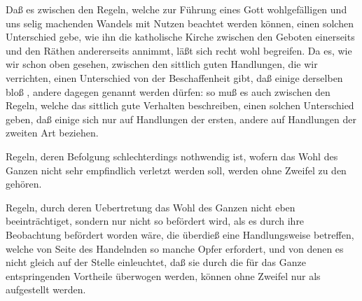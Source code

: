 Daß es zwischen den Regeln, welche zur Führung eines Gott wohlgefälligen und uns selig machenden Wandels mit Nutzen beachtet werden können, einen solchen Unterschied gebe, wie ihn die katholische Kirche zwischen den Geboten einerseits und den Räthen andererseits annimmt, läßt sich recht wohl begreifen. Da es, wie wir schon oben gesehen, zwischen den sittlich guten Handlungen, die wir verrichten, einen Unterschied von der Beschaffenheit gibt, daß einige derselben bloß , andere dagegen  genannt werden dürfen: so muß es auch zwischen den Regeln, welche das sittlich gute Verhalten beschreiben, einen solchen Unterschied geben, daß einige sich nur auf Handlungen der ersten, andere auf Handlungen der zweiten Art beziehen.
\begin{aufza}
\item Regeln, deren Befolgung schlechterdings nothwendig ist, wofern das Wohl des Ganzen nicht sehr empfindlich verletzt werden soll, werden ohne Zweifel zu den  gehören.
\item Regeln, durch deren Uebertretung das Wohl des Ganzen nicht eben beeinträchtiget, sondern nur nicht so befördert wird, als es durch ihre Beobachtung befördert worden wäre, die überdieß eine Handlungsweise betreffen, welche von Seite des Handelnden so manche Opfer erfordert, und von denen es nicht gleich auf der Stelle einleuchtet, daß sie durch die für das Ganze entspringenden Vortheile überwogen werden, können ohne Zweifel nur als  aufgestellt werden.
\end{aufza}
